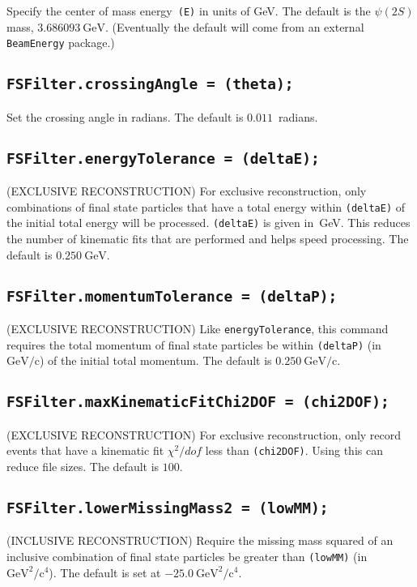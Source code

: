 \documentclass[11pt]{article}
\newcommand{\gev}{\mathrm{GeV}}
\newcommand{\gevc}{\mathrm{GeV/c}}
\newcommand{\gevccgevcc}{\mathrm{GeV^2/c^4}}
\begin{document}
Specify the center of mass energy~{\tt (E)} in units of GeV.  The default is the $\psi(2S)$ mass, $3.686093~\gev$.  (Eventually the default will come from an external {\tt BeamEnergy} package.)

\subsection{\tt FSFilter.crossingAngle = (theta);}

Set the crossing angle in radians.  The default is $0.011$~radians.

\subsection{\tt FSFilter.energyTolerance = (deltaE);}

(EXCLUSIVE RECONSTRUCTION) For exclusive reconstruction, only combinations of final state particles that have a total energy within {\tt (deltaE)} of the initial total energy will be processed.  {\tt (deltaE)} is given in~GeV.  This reduces the number of kinematic fits that are performed and helps speed processing.  The default is $0.250~\gev$.

\subsection{\tt FSFilter.momentumTolerance = (deltaP);}

(EXCLUSIVE RECONSTRUCTION) Like {\tt energyTolerance}, this command requires the total momentum of final state particles be within {\tt (deltaP)} (in~$\gevc$) of the initial total momentum.  The default is $0.250~\gevc$.

\subsection{\tt FSFilter.maxKinematicFitChi2DOF = (chi2DOF);}

(EXCLUSIVE RECONSTRUCTION) For exclusive reconstruction, only record events that have a kinematic fit $\chi^2/dof$ less than {\tt (chi2DOF)}.  Using this can reduce file sizes.  The default is $100$.

\subsection{\tt FSFilter.lowerMissingMass2 = (lowMM);}

(INCLUSIVE RECONSTRUCTION) Require the missing mass squared of an inclusive combination of final state particles be greater than {\tt (lowMM)} (in~$\gevccgevcc$).  The default is set at $-25.0~\gevccgevcc$.
\end{document}
